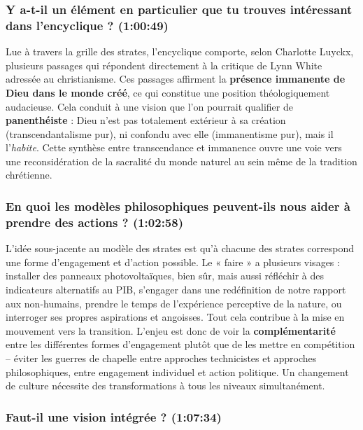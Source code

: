 \subsubsection{Y a-t-il un élément en particulier que tu trouves intéressant dans l'encyclique ? \textnormal{\small(1:00:49)}}

Lue à travers la grille des strates, l'encyclique comporte, selon Charlotte Luyckx, plusieurs passages qui répondent directement à la critique de Lynn White adressée au christianisme. Ces passages affirment la \textbf{présence immanente de Dieu dans le monde créé}, ce qui constitue une position théologiquement audacieuse. Cela conduit à une vision que l'on pourrait qualifier de \textbf{panenthéiste} : Dieu n'est pas totalement extérieur à sa création (transcendantalisme pur), ni confondu avec elle (immanentisme pur), mais il l'\textit{habite}. Cette synthèse entre transcendance et immanence ouvre une voie vers une reconsidération de la sacralité du monde naturel au sein même de la tradition chrétienne.

\subsubsection{En quoi les modèles philosophiques peuvent-ils nous aider à prendre des actions ? \textnormal{\small(1:02:58)}}

L'idée sous-jacente au modèle des strates est qu'à chacune des strates correspond une forme d'engagement et d'action possible. Le « faire » a plusieurs visages : installer des panneaux photovoltaïques, bien sûr, mais aussi réfléchir à des indicateurs alternatifs au PIB, s'engager dans une redéfinition de notre rapport aux non-humains, prendre le temps de l'expérience perceptive de la nature, ou interroger ses propres aspirations et angoisses. Tout cela contribue à la mise en mouvement vers la transition. L'enjeu est donc de voir la \textbf{complémentarité} entre les différentes formes d'engagement plutôt que de les mettre en compétition -- éviter les guerres de chapelle entre approches technicistes et approches philosophiques, entre engagement individuel et action politique. Un changement de culture nécessite des transformations à tous les niveaux simultanément.

\subsubsection{Faut-il une vision intégrée ? \textnormal{\small(1:07:34)}}

